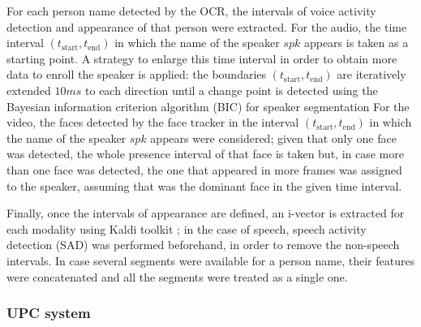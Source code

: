 For each person name detected by the OCR, the intervals of voice activity detection and appearance of that person were extracted. For the audio, 
the time interval $(t_{\mathrm{start}},t_{\mathrm{end}})$ in which the name of the speaker $spk$ appears is taken as a starting point. A strategy to enlarge this time
 interval in order to obtain more data to enroll the speaker is applied: the boundaries $(t_{\mathrm{start}},t_{\mathrm{end}})$ are iteratively extended $10ms$ to each direction until a change point is detected using the Bayesian information criterion algorithm
 (BIC) for speaker segmentation
%
% 
For the video, the faces detected by the face tracker in the interval $(t_{\mathrm{start}},t_{\mathrm{end}})$ in 
 which the name of the speaker $spk$ appears were considered; given that only one face was detected, the whole presence interval of that face is taken but, in case more than 
 one face was detected, the one that appeared in more frames was assigned to the speaker, assuming that was the dominant face in the given time interval.
 
 Finally, once the intervals of appearance are defined, an i-vector \cite{dehak10} is extracted for each modality using Kaldi toolkit \cite{kaldi}; in the case of speech, speech activity detection (SAD) was performed
 beforehand, in order to remove the non-speech intervals. In case several segments were available for a person name, their features were concatenated and all the segments
 were treated as a single one.

\subsubsection{UPC system}

